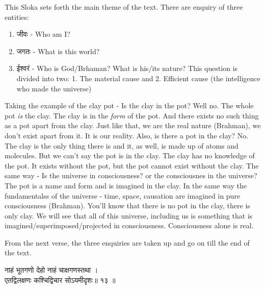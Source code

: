 \documentclass{article}
\begin{document}
\begin{oframed}
This Sloka sets forth the main theme of the text.
There are enquiry of three entities:
\begin{enumerate}
    \item{
            \texthindi{जीवः}
            - Who am I?
        }
    \item{
            \texthindi{जगतः}
            - What is this world?
        }
    \item{
            \texthindi{ईश्वरं}
            - Who is God/Brhaman? What is his/its nature?
            This question is divided into two: 1. The material cause and
            2. Efficient cause (the intelligence who made the universe)

        }
\end{enumerate}


Taking the example of the clay pot - Is the clay in the pot? Well no. The whole
pot \textit{is} the clay. The clay is in the \textit{form} of the pot.  And
there exists no such thing as a pot apart from the clay. Just like that, we
are the real nature (Brahman), we don't exist apart from it. It is our
reality. Also, is there a pot in the clay? No. The clay is the only thing
there is and it, as well, is made up of atoms and molecules. But we can't say
the pot is in the clay. The clay has no knowledge of the pot. It exists
without the pot, but the pot cannot exist without the clay. The same way -
Is the universe in consciousness? or the consciousnes in the universe? The
pot is a name and form and is imagined in the clay. In the same way the
fundamentalss of the universe - time, space, causation are imagined in pure
consciousness (Brahman). You'll know that there is no pot in the clay,
there is only clay. We will see that all of this universe, including us is
something that is imagined/superimposed/projected in consciousness.
Consciousness alone is real.

From the next verse, the three enquiries are taken up and go on till the end of
    the text.

\end{oframed}

\bigskip

\begin{large}
\begin{center}
    \begin{hindi}

    नाहं भूतगणो देहो नाहं चाक्षगणस्तथा ।\\
    एतद्विलक्षणः कश्चिद्विचार सोऽयमीदृशः॥ १३ ॥

    \end{hindi}
\end{center}
\end{large}
\end{document}
